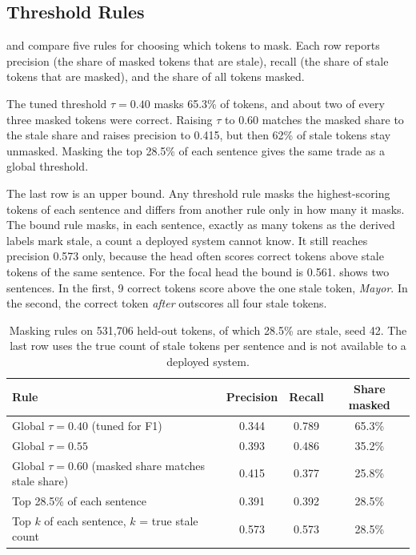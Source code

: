 \documentclass[]{paper}
\begin{document}
\subsection{Threshold Rules}

 and  compare five rules for choosing which tokens to mask. Each row reports precision (the share of masked tokens that are stale), recall (the share of stale tokens that are masked), and the share of all tokens masked.

The tuned threshold $\tau = 0.40$ masks 65.3\% of tokens, and about two of every three masked tokens were correct. Raising $\tau$ to 0.60 matches the masked share to the stale share and raises precision to 0.415, but then 62\% of stale tokens stay unmasked. Masking the top 28.5\% of each sentence gives the same trade as a global threshold.

The last row is an upper bound. Any threshold rule masks the highest-scoring tokens of each sentence and differs from another rule only in how many it masks. The bound rule masks, in each sentence, exactly as many tokens as the derived labels mark stale, a count a deployed system cannot know. It still reaches precision 0.573 only, because the head often scores correct tokens above stale tokens of the same sentence. For the focal head the bound is 0.561.  shows two sentences. In the first, 9 correct tokens score above the one stale token, \emph{Mayor}. In the second, the correct token \emph{after} outscores all four stale tokens.

\begin{table}[t]
\caption{Masking rules on 531,706 held-out tokens, of which 28.5\% are stale, seed 42. The last row uses the true count of stale tokens per sentence and is not available to a deployed system.}
\label{tab:rules}
\centering
\small
\begin{tabular}{lccc}
\toprule
Rule & Precision & Recall & Share masked \\
\midrule
Global $\tau = 0.40$ (tuned for F1) & 0.344 & 0.789 & 65.3\% \\
Global $\tau = 0.55$ & 0.393 & 0.486 & 35.2\% \\
Global $\tau = 0.60$ (masked share matches stale share) & 0.415 & 0.377 & 25.8\% \\
Top 28.5\% of each sentence & 0.391 & 0.392 & 28.5\% \\
Top $k$ of each sentence, $k$ = true stale count & 0.573 & 0.573 & 28.5\% \\
\bottomrule
\end{tabular}
\end{table}
\end{document}
